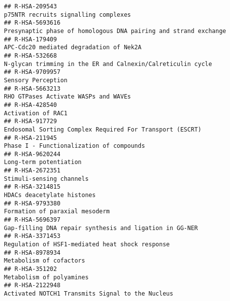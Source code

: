 \documentclass[
]{article}
\begin{document}
\begin{verbatim}
## R-HSA-209543                                                                                                  p75NTR recruits signalling complexes
## R-HSA-5693616                                                                      Presynaptic phase of homologous DNA pairing and strand exchange
## R-HSA-179409                                                                                               APC-Cdc20 mediated degradation of Nek2A
## R-HSA-532668                                                                           N-glycan trimming in the ER and Calnexin/Calreticulin cycle
## R-HSA-9709957                                                                                                                   Sensory Perception
## R-HSA-5663213                                                                                                 RHO GTPases Activate WASPs and WAVEs
## R-HSA-428540                                                                                                                    Activation of RAC1
## R-HSA-917729                                                                              Endosomal Sorting Complex Required For Transport (ESCRT)
## R-HSA-211945                                                                                              Phase I - Functionalization of compounds
## R-HSA-9620244                                                                                                               Long-term potentiation
## R-HSA-2672351                                                                                                             Stimuli-sensing channels
## R-HSA-3214815                                                                                                           HDACs deacetylate histones
## R-HSA-9793380                                                                                                       Formation of paraxial mesoderm
## R-HSA-5696397                                                                              Gap-filling DNA repair synthesis and ligation in GG-NER
## R-HSA-3371453                                                                                      Regulation of HSF1-mediated heat shock response
## R-HSA-8978934                                                                                                              Metabolism of cofactors
## R-HSA-351202                                                                                                              Metabolism of polyamines
## R-HSA-2122948                                                                                     Activated NOTCH1 Transmits Signal to the Nucleus

\end{verbatim}
\end{document}

